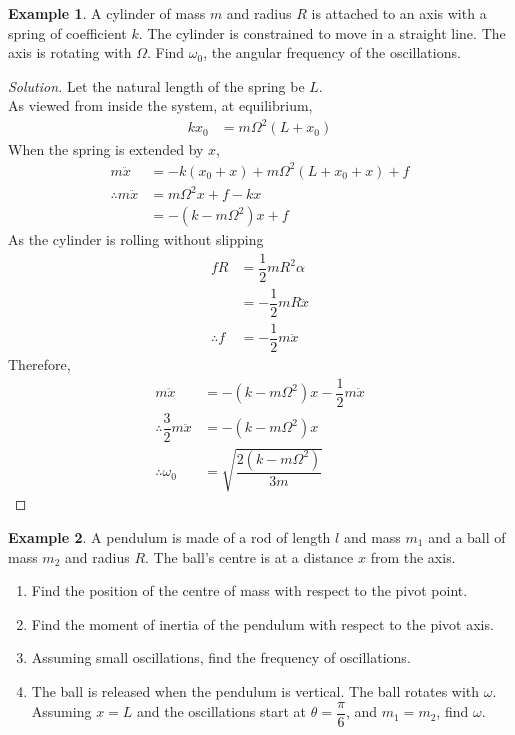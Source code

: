 \documentclass[fleqn, a4paper, 12pt]{article}
\theoremstyle{definition}
\newtheorem{example}{Example}
\theoremstyle{theorem}
\newenvironment{solution}
{\begin{proof}[Solution]\let\qed\relax}
	{\end{proof}}
\begin{document}
\begin{example}
	A cylinder of mass $m$ and radius $R$ is attached to an axis with a spring of coefficient $k$. The cylinder is constrained to move in a straight line. The axis is rotating with $\Omega$. Find $\omega_0$, the angular frequency of the oscillations.
\end{example}

\begin{solution}
	Let the natural length of the spring be $L$.\\
	As viewed from inside the system, at equilibrium,
	\begin{align*}
		k x_0 &= m \Omega^2 (L + x_0)
	\end{align*}
	When the spring is extended by $x$,
	\begin{align*}
		m \ddot{x} &= - k(x_0 + x) + m \Omega^2 (L + x_0 + x) + f\\
		\therefore m \ddot{x} &= m \Omega^2 x + f - k x\\
		&= - (k - m \Omega^2) x + f
	\end{align*}
	As the cylinder is rolling without slipping
	\begin{align*}
		f R &= \dfrac{1}{2} m R^2 \alpha\\
		&= -\dfrac{1}{2} m R \ddot{x}\\
		\therefore f &= -\dfrac{1}{2} m \ddot{x}
	\end{align*}
	Therefore,
	\begin{align*}
		m \ddot{x} &= - (k - m \Omega^2) x - \dfrac{1}{2} m \ddot{x}\\
		\therefore \dfrac{3}{2} m \ddot{x} &= - (k - m \Omega^2) x\\
		\therefore \omega_0 &= \sqrt{\dfrac{2(k - m \Omega^2)}{3 m}}
	\end{align*}
\end{solution}

\begin{example}
	A pendulum is made of a rod of length $l$ and mass $m_1$ and a ball of mass $m_2$ and radius $R$. The ball's centre is at a distance $x$ from the axis. 
		\begin{enumerate}
			\item Find the position of the centre of mass with respect to the pivot point. 
			\item Find the moment of inertia of the pendulum with respect to the pivot axis. 
			\item Assuming small oscillations, find the frequency of oscillations. 
			\item The ball is released when the pendulum is vertical. The ball rotates with $\omega$. Assuming $x = L$ and the oscillations start at $\theta = \dfrac{\pi}{6}$, and $m_1 = m_2$, find $\omega$.
		\end{enumerate}
\end{example}
\end{document}
